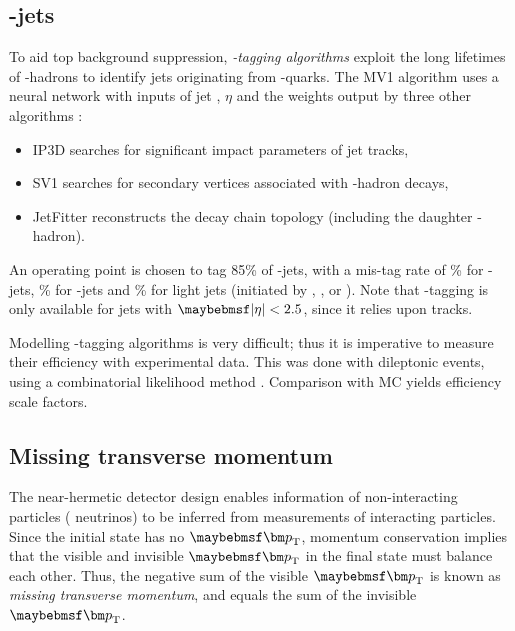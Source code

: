 \subsection{\Pbottom-jets}
\label{sec:objects:bjets}

To aid top background suppression, \textit{\Pbottom-tagging algorithms} exploit the long 
lifetimes of \Pbottom-hadrons to identify jets originating from \Pbottom-quarks. The MV1 
algorithm uses a neural network with inputs of jet \pt, $\eta$ and the weights output 
by three other algorithms \cite{Btag:algorithms}:
\begin{itemize}[noitemsep,nolistsep]
	\item IP3D searches for significant impact parameters of jet tracks, \storeliststyle{}
	\item SV1 searches for secondary vertices associated with \Pbottom-hadron decays,
	\item JetFitter reconstructs the decay chain topology (including the daughter 
	\Pcharm-hadron).
\end{itemize}
An operating point is chosen to tag 85\% of \Pbottom-jets, with a mis-tag rate of 
\% for \Pcharm-jets, \% for \Ptau-jets and \% for light jets
(initiated by \Pup, \Pdown, \Pstrange or \Pgluon). Note that \Pbottom-tagging is only 
available for jets with $\mods{\eta} < 2.5$, since it relies upon tracks.

Modelling \Pbottom-tagging algorithms is very difficult; thus it is imperative to measure 
their efficiency with experimental data. This was done with dileptonic \ttbar events, 
using a combinatorial likelihood method \cite{Btag:llh}. Comparison with MC yields 
efficiency scale factors.



\subsection{Missing transverse momentum}
\label{sec:objects:met}

The near-hermetic detector design enables information of non-interacting particles (\eg 
neutrinos) to be inferred from measurements of interacting particles. Since the initial 
state has no $\bvec{p}_{\text{T}}$, momentum conservation implies that the visible and 
invisible $\bvec{p}_{\text{T}}$ in the final state must balance each other. Thus, the 
negative sum of the visible $\bvec{p}_{\text{T}}$ is known as \textit{missing transverse 
momentum}, and equals the sum of the invisible $\bvec{p}_{\text{T}}$.

